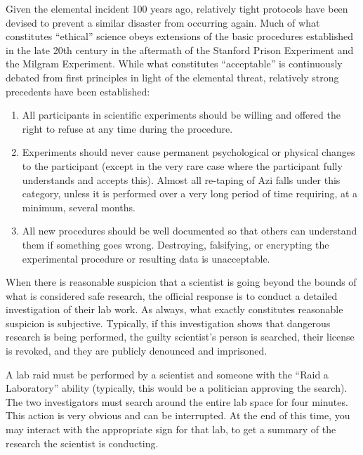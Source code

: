 \documentclass[green]{elementals}
\begin{document}
\name{\gEthics{}}

Given the elemental incident 100 years ago, relatively tight protocols have been devised to prevent a similar disaster from occurring again. Much of what constitutes ``ethical'' science obeys extensions of the basic procedures established in the late 20th century in the aftermath of the Stanford Prison Experiment and the Milgram Experiment. While what constitutes ``acceptable'' is continuously debated from first principles in light of the elemental threat, relatively strong precedents have been established:

\begin{enumerate}
\item All participants in scientific experiments should be willing and offered the right to refuse at any time during the procedure.
\item Experiments should never cause permanent psychological or physical changes to the participant (except in the very rare case where the participant fully understands and accepts this). Almost all re-taping of Azi falls under this category, unless it is performed over a very long period of time requiring, at a minimum, several months.
\item All new procedures should be well documented so that others can understand them if something goes wrong. Destroying, falsifying, or encrypting the experimental procedure or resulting data is unacceptable.
\end{enumerate}

When there is reasonable suspicion that a scientist is going beyond the bounds of what is considered safe research, the official response is to conduct a detailed investigation of their lab work. As always, what exactly constitutes reasonable suspicion is subjective. Typically, if this investigation shows that dangerous research is being performed, the guilty scientist's person is searched, their license is revoked, and they are publicly denounced and imprisoned.

A lab raid must be performed by a scientist and someone with the ``Raid a Laboratory'' ability (typically, this would be a politician approving the search). The two investigators must search around the entire lab space for four minutes. This action is very obvious and can be interrupted. At the end of this time, you may interact with the appropriate sign for that lab, to get a summary of the research the scientist is conducting.
\end{document}
